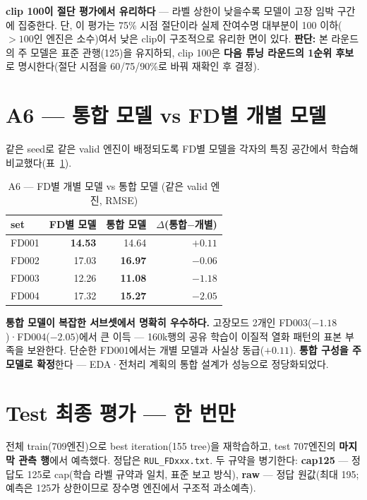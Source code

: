 \documentclass[11pt]{article}
\begin{document}
\textbf{clip 100이 절단 평가에서 유리하다} — 라벨 상한이 낮을수록 모델이 고장 임박 구간에 집중한다.
단, 이 평가는 75\% 시점 절단이라 실제 잔여수명 대부분이 100 이하($>100$인 엔진은 소수)여서 낮은 clip이 구조적으로 유리한 면이 있다.
\textbf{판단:} 본 라운드의 주 모델은 표준 관행(125)을 유지하되, clip 100은 \textbf{다음 튜닝 라운드의 1순위 후보}로 명시한다(절단 시점을 60/75/90\%로 바꿔 재확인 후 결정).

\section{A6 — 통합 모델 vs FD별 개별 모델}

같은 seed로 같은 valid 엔진이 배정되도록 FD별 모델을 각자의 특징 공간에서 학습해 비교했다(표~\ref{tab:a6}).

\begin{table}[H]
\centering
\caption{A6 — FD별 개별 모델 vs 통합 모델 (같은 valid 엔진, RMSE)}
\label{tab:a6}
\begin{tabular}{lrrr}
\toprule
set & FD별 모델 & 통합 모델 & $\Delta$(통합$-$개별) \\
\midrule
FD001 & \textbf{14.53} & 14.64 & $+0.11$ \\
FD002 & 17.03 & \textbf{16.97} & $-0.06$ \\
FD003 & 12.26 & \textbf{11.08} & $-1.18$ \\
FD004 & 17.32 & \textbf{15.27} & $\mathbf{-2.05}$ \\
\bottomrule
\end{tabular}
\end{table}

\textbf{통합 모델이 복잡한 서브셋에서 명확히 우수하다.}
고장모드 2개인 FD003($-1.18$)·FD004($-2.05$)에서 큰 이득 — 160k행의 공유 학습이 이질적 열화 패턴의 표본 부족을 보완한다.
단순한 FD001에서는 개별 모델과 사실상 동급($+0.11$).
\textbf{통합 구성을 주 모델로 확정}한다 — EDA·전처리 계획의 통합 설계가 성능으로 정당화되었다.

\section{Test 최종 평가 — 한 번만}

전체 train(709엔진)으로 best iteration(155 tree)을 재학습하고, test 707엔진의 \textbf{마지막 관측 행}에서 예측했다.
정답은 \texttt{RUL\_FDxxx.txt}.
두 규약을 병기한다:
\textbf{cap125} — 정답도 125로 cap(학습 라벨 규약과 일치, 표준 보고 방식),
\textbf{raw} — 정답 원값(최대 195; 예측은 125가 상한이므로 장수명 엔진에서 구조적 과소예측).
\end{document}
